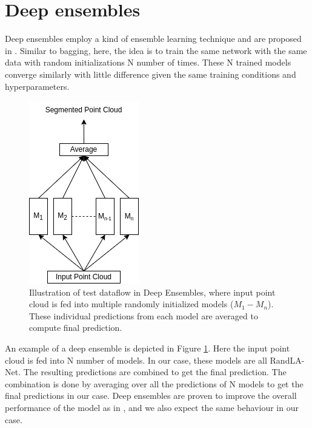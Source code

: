 \section{Deep ensembles}
\label{sec:meth_deepensembles}
Deep ensembles employ a kind of ensemble learning technique and are proposed in \cite{lakshminarayanan2016simple}.
Similar to bagging, here, the idea is to train the same network with the same data with random initializations N number of times.
These N trained models converge similarly with little difference given the same training conditions and hyperparameters.
\begin{figure}
    \centering
    \includegraphics[scale=0.55]{images/DE.jpg}
    \caption{Illustration of test dataflow in Deep Ensembles, where input point cloud is fed into multiple randomly initialized models ($M_1-M_n$). 
    These individual predictions from each model are averaged to compute final prediction.}
    \label{fig:deepensembles}
\end{figure}
An example of a deep ensemble is depicted in Figure \ref{fig:deepensembles}.
Here the input point cloud is fed into N number of models. In our case, these models are all RandLA-Net.
The resulting predictions are combined to get the final prediction. 
The combination is done by averaging over all the predictions of N models to get the final predictions in our case.
Deep ensembles are proven to improve the overall performance of the model as in \cite{bhandary2020evaluating}, and we also expect the same behaviour in our case.

